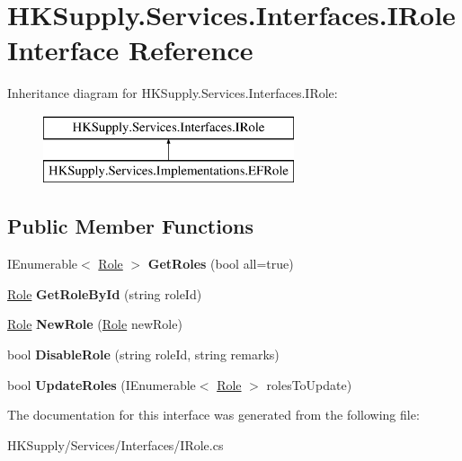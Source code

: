 \hypertarget{interface_h_k_supply_1_1_services_1_1_interfaces_1_1_i_role}{}\section{H\+K\+Supply.\+Services.\+Interfaces.\+I\+Role Interface Reference}
\label{interface_h_k_supply_1_1_services_1_1_interfaces_1_1_i_role}
Inheritance diagram for H\+K\+Supply.\+Services.\+Interfaces.\+I\+Role\+:\begin{figure}[H]
\begin{center}
\leavevmode
\includegraphics[height=2.000000cm]{interface_h_k_supply_1_1_services_1_1_interfaces_1_1_i_role}
\end{center}
\end{figure}
\subsection*{Public Member Functions}
\begin{DoxyCompactItemize}
\item 
\mbox{\label{interface_h_k_supply_1_1_services_1_1_interfaces_1_1_i_role_a921bacd80020de3cf811705857c9eb7e}} 
I\+Enumerable$<$ \hyperlink{class_h_k_supply_1_1_models_1_1_role}{Role} $>$ {\bfseries Get\+Roles} (bool all=true)
\item 
\mbox{\label{interface_h_k_supply_1_1_services_1_1_interfaces_1_1_i_role_ad83423359435ae70026a1daac5bd07ae}} 
\hyperlink{class_h_k_supply_1_1_models_1_1_role}{Role} {\bfseries Get\+Role\+By\+Id} (string role\+Id)
\item 
\mbox{\label{interface_h_k_supply_1_1_services_1_1_interfaces_1_1_i_role_a7fea1e910bcd64d8e99da8bf4438e50f}} 
\hyperlink{class_h_k_supply_1_1_models_1_1_role}{Role} {\bfseries New\+Role} (\hyperlink{class_h_k_supply_1_1_models_1_1_role}{Role} new\+Role)
\item 
\mbox{\label{interface_h_k_supply_1_1_services_1_1_interfaces_1_1_i_role_a4f5e4bf501b1affbae4d3d39dbb837b5}} 
bool {\bfseries Disable\+Role} (string role\+Id, string remarks)
\item 
\mbox{\label{interface_h_k_supply_1_1_services_1_1_interfaces_1_1_i_role_a0960468c3fb4db4f09b3175106ee7753}} 
bool {\bfseries Update\+Roles} (I\+Enumerable$<$ \hyperlink{class_h_k_supply_1_1_models_1_1_role}{Role} $>$ roles\+To\+Update)
\end{DoxyCompactItemize}


The documentation for this interface was generated from the following file\+:\begin{DoxyCompactItemize}
\item 
H\+K\+Supply/\+Services/\+Interfaces/I\+Role.\+cs\end{DoxyCompactItemize}

